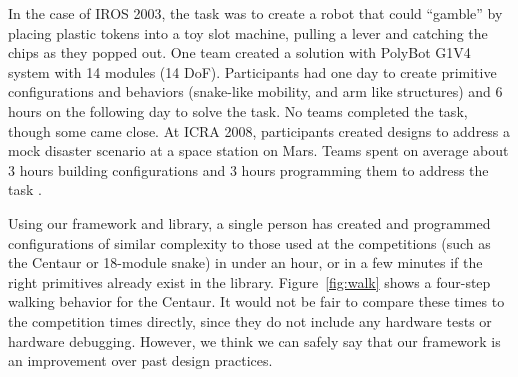 \documentclass[graybox]{svmult}
\begin{document}
In the case of IROS 2003, the task was to create a robot that could ``gamble'' by placing plastic tokens into a toy slot machine, pulling a lever and catching the chips as they popped out.  One team created a solution with PolyBot G1V4 system with 14 modules (14 DoF). Participants
had one day to create primitive configurations and behaviors (snake-like mobility, and arm like structures) and
 6 hours on the following day to solve the task. No teams completed the task, though
some came close. 
At ICRA 2008, participants created designs to address a mock disaster scenario
at a space station on Mars. Teams spent on average about 3 hours building configurations and
3 hours programming them to address the task \cite{sastra2011using}.  
  
Using our framework and library, a single person has created and programmed   configurations of similar complexity to those used at
the competitions (such as the Centaur or 18-module snake)
in under an hour,
or in a few minutes if the right primitives already exist in the library. Figure~\ref{fig:walk} shows a four-step walking behavior for the Centaur. It would
not be fair to compare these times to the competition times directly, since they do not include any
hardware tests or hardware debugging. However, we think we can safely say that
our framework is an improvement over past design practices.
\end{document}

